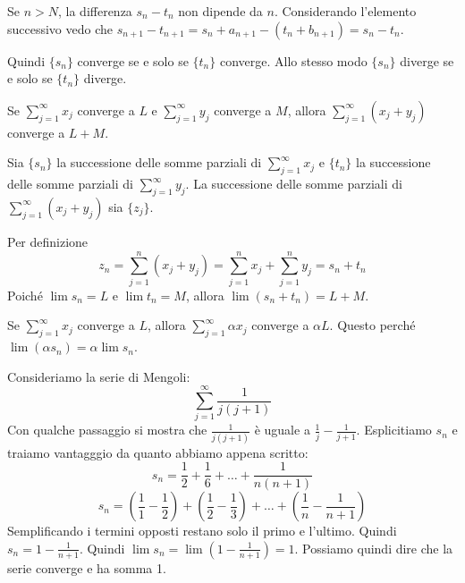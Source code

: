 Se $n > N$, la differenza $s_n - t_n$ non dipende da $n$. Considerando l'elemento successivo vedo che $s_{n+1} - t_{n+1} = s_n + a_{n+1} - (t_n + b_{n+1}) = s_n - t_n$.

Quindi $\{s_n\}$ converge se e solo se $\{t_n\}$ converge. Allo stesso modo $\{s_n\}$ diverge se e solo se $\{t_n\}$ diverge.

\begin{remark}
Se $\sum_{j=1}^\infty x_j$ converge a $L$ e $\sum_{j=1}^\infty y_j$ converge a $M$, allora $\sum_{j=1}^\infty (x_j + y_j)$ converge a $L+M$.
\end{remark}

Sia $\{s_n\}$ la successione delle somme parziali di $\sum_{j=1}^\infty x_j$ e $\{t_n\}$ la successione delle somme parziali di $\sum_{j=1}^\infty y_j$. La successione delle somme parziali di $\sum_{j=1}^\infty (x_j + y_j)$ sia $\{z_j\}$.

Per definizione
\begin{equation*}
z_n = \sum_{j=1}^n (x_j+y_j) = \sum_{j=1}^n x_j + \sum_{j=1}^n y_j = s_n + t_n
\end{equation*}
Poiché $\lim s_n = L$ e $\lim t_n = M$, allora $\lim (s_n+t_n) = L + M$.

\begin{remark}
Se $\sum_{j=1}^\infty x_j$ converge a $L$, allora $\sum_{j=1}^\infty \alpha x_j$ converge a $\alpha L$. Questo perché $\lim (\alpha s_n) = \alpha \lim s_n$.
\end{remark}

\begin{example}
Consideriamo la serie di Mengoli:
\begin{equation*}
\sum_{j=1}^\infty \frac{1}{j(j+1)}
\end{equation*}
Con qualche passaggio si mostra che $\frac{1}{j(j+1)}$ è uguale a $\frac{1}{j} - \frac{1}{j+1}$. Esplicitiamo $s_n$ e traiamo vantagggio da quanto abbiamo appena scritto:
\begin{equation*}
s_n = \frac{1}{2} + \frac{1}{6} + \ldots + \frac{1}{n(n+1)}
\end{equation*}
\begin{equation*}
s_n = \left(\frac{1}{1} - \frac{1}{2}\right) + \left(\frac{1}{2}-\frac{1}{3}\right) + \ldots + \left(\frac{1}{n} - \frac{1}{n+1} \right)
\end{equation*}
Semplificando i termini opposti restano solo il primo e l'ultimo. Quindi $s_n = 1 - \frac{1}{n+1}$. Quindi $\lim s_n = \lim (1-\frac{1}{n+1}) = 1$. Possiamo quindi dire che la serie converge e ha somma 1.

\end{example}


